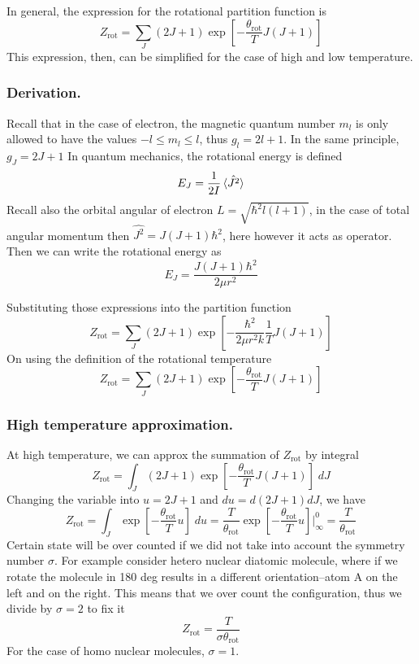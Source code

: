 \documentclass[../../../Main.tex]{subfiles}
\begin{document}
In general, the expression for the rotational partition function is
\begin{equation*}
	Z_\text{rot}=\sum_J(2J+1)\exp\left[-\frac{\theta_\text{rot}}{T}J(J+1)\right]
\end{equation*}
This expression, then, can be simplified for the case of high and low temperature.

\subsubsection*{Derivation.} Recall that in the case of electron, the magnetic quantum number $m_l$ is only allowed to have the values $-l\leq m_l\leq l$, thus $g_l=2l+1$. In the same principle, $g_J=2J+1$ In quantum mechanics, the rotational energy is defined
\begin{equation*}
	E_J=\frac{1}{2I}\braket{\hat{J^2}}
\end{equation*}
Recall also the orbital angular of electron $L=\sqrt{\hbar^2l(l+1)}$, in the case of total angular momentum then $\hat{J^2}= J(J+1)\hbar^2$, here however it acts as operator. Then we can write the rotational energy as
\begin{equation*}
	E_J=\frac{J(J+1)\hbar^2}{2\mu r^2 }
\end{equation*}

Substituting those expressions into the partition function
\begin{equation*}
	Z_\text{rot}=\sum_J(2J+1)\exp\left[-\frac{\hbar^2}{2\mu r^2 k}\frac{1}{T}J(J+1)\right]
\end{equation*}
On using the definition of the rotational temperature
\begin{equation*}
	Z_\text{rot}=\sum_J(2J+1)\exp\left[-\frac{\theta_\text{rot}}{T}J(J+1)\right]
\end{equation*}

\subsubsection*{High temperature approximation.} At high temperature, we can approx the summation of $Z_\text{rot}$ by integral
\begin{equation*}
	Z_\text{rot}=\int_J (2J+1)\exp\left[-\frac{\theta_\text{rot}}{T}J(J+1)\right]\;dJ
\end{equation*}
Changing the variable into $u=2J+1$ and $du=d(2J+1)dJ$, we have
\begin{equation*}
	Z_\text{rot}=\int_J\exp\left[-\frac{\theta_\text{rot}}{T}u\right]\;du=\frac{T}{\theta_\text{rot}}\exp\left[-\frac{\theta_\text{rot}}{T}u\right]\bigg|_\infty^0=\frac{T}{\theta_\text{rot}}
\end{equation*}
Certain state will be over counted if we did not take into account the symmetry number $\sigma$. For example consider hetero nuclear diatomic molecule, where if we rotate the molecule in 180 deg results in a different orientation--atom A on the left and on the right. This means that we over count the configuration, thus we divide by $\sigma=2$ to fix it
\begin{equation*}
	Z_\text{rot}=\frac{T}{\sigma\theta_\text{rot}}
\end{equation*}
For the case of homo nuclear molecules, $\sigma=1$.
\end{document}
